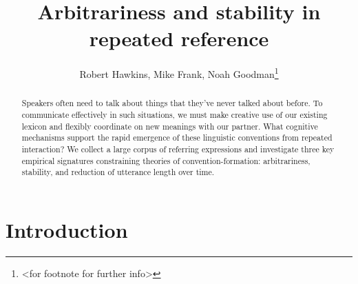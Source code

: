 \documentclass[manuscript]{stjour}
\begin{document}
\title{Arbitrariness and stability in repeated reference}



\author[Author Names]
{Robert Hawkins, Mike Frank, Noah Goodman\thanks{<for footnote for further info>}}







\begin{abstract}
Speakers often need to talk about things that they've never talked about before. To communicate effectively in such situations, we must make creative use of our existing lexicon and flexibly coordinate on new meanings with our partner. What cognitive mechanisms support the rapid emergence of these linguistic conventions from repeated interaction? 
We collect a large corpus of referring expressions and investigate three key empirical signatures constraining theories of convention-formation: arbitrariness, stability, and reduction of utterance length over time. 
\end{abstract}

\section{Introduction}\label{introduction}
\end{document}
